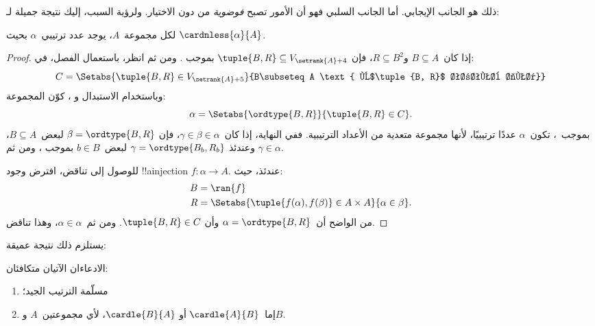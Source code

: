 \documentclass[../../../include/open-logic-section]{subfiles}
\begin{document}

ذلك هو الجانب الإيجابي. أما الجانب السلبي فهو أن الأمور تصبح
\emph{فوضوية} من دون الاختيار. ولرؤية السبب، إليك نتيجة جميلة
لـ\cite{Hartogs1915}:

\begin{lem}[\emph{في $\ZF$}]
لكل مجموعة~$A$، يوجد عدد ترتيبي~$\alpha$ بحيث
$\cardnless{\alpha}{A}$.
\end{lem}

\begin{proof}
إذا كان~$B \subseteq A$ و$R \subseteq B^2$، فإن
$\tuple{B, R} \subseteq V_{\setrank{A}+4}$ بموجب
. ومن ثم انظر،
باستعمال الفصل، في:
\[
	C = \Setabs{\tuple{B, R} \in V_{\setrank{A}+5}}{B\subseteq A
	\text{ و$\tuple{B, R}$ ترتيب جيد}}
\]
وباستخدام الاستبدال و
، كوّن المجموعة:
\[
	\alpha = \Setabs{\ordtype{B, R}}{\tuple{B, R} \in C}.
\]
بموجب~، تكون~$\alpha$
عددًا ترتيبيًا، لأنها مجموعة متعدية من الأعداد الترتيبية. ففي
النهاية، إذا كان~$\gamma \in \beta \in \alpha$، فإن
$\beta = \ordtype{B, R}$ لبعض~$B \subseteq A$، وعندئذ
$\gamma = \ordtype{B_b, R_b}$ لبعض~$b \in B$ بموجب
، ومن ثم
$\gamma \in \alpha$.

للوصول إلى تناقض، افترض وجود !!a{injection}
$f \colon \alpha \to A$. عندئذ، حيث:
\begin{align*}
	B &= \ran{f}\\
	R &= \Setabs{\tuple{f(\alpha), f(\beta)} \in A \times A}{\alpha \in \beta}.
\end{align*}
من الواضح أن~$\alpha = \ordtype{B, R}$ وأن
$\tuple{B, R} \in C$. ومن ثم~$\alpha \in \alpha$، وهذا تناقض.
\end{proof}

يستلزم ذلك نتيجة عميقة:

\begin{thm}[\emph{في $\ZF$}]
الادعاءان الآتيان متكافئان:
\begin{enumerate}
	\item{} مسلّمة الترتيب الجيد؛
	\item{} إما~$\cardle{A}{B}$ أو
	$\cardle{B}{A}$، لأي مجموعتين~$A$ و$B$.
\end{enumerate}
\end{thm}
\end{document}
